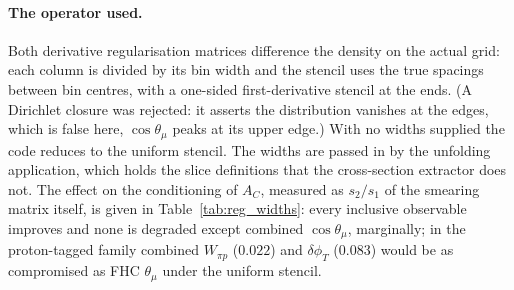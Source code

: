 \documentclass[11pt,a4paper]{article}
\begin{document}
\paragraph{The operator used.} Both derivative regularisation matrices difference the
density on the actual grid: each column is divided by its bin width and the stencil uses
the true spacings between bin centres, with a one-sided first-derivative stencil at the
ends. (A Dirichlet closure was rejected: it asserts the distribution vanishes at the
edges, which is false here, $\cos\theta_\mu$ peaks at its upper edge.) With no widths
supplied the code reduces to the uniform stencil. The widths are passed in by the
unfolding application, which holds the slice definitions that the cross-section extractor
does not. The effect on the conditioning of $A_C$, measured as $s_2/s_1$ of the smearing
matrix itself, is given in Table~\ref{tab:reg_widths}: every inclusive observable improves
and none is degraded except combined $\cos\theta_\mu$, marginally; in the proton-tagged
family combined $W_{\pi p}$ ($0.022$) and $\delta\phi_T$ ($0.083$) would be as
compromised as FHC $\theta_\mu$ under the uniform stencil.
\end{document}
